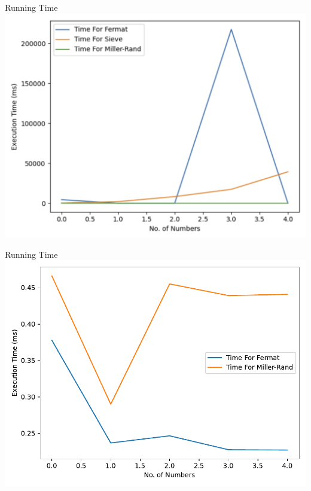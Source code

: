 \documentclass{beamer}
\begin{document}
\begin{frame}{Running Time}
      \includegraphics[width=\textwidth]{Fermat-Sieve-MillerRand.pdf}
\end{frame}
\begin{frame}{Running Time}
      \includegraphics[width=\textwidth]{Fermat-MillerRand.pdf}
\end{frame}
\end{document}
